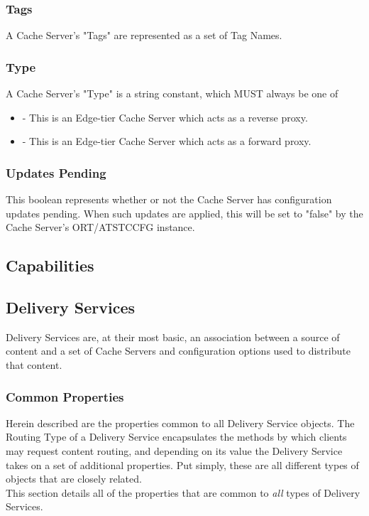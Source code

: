 \subsubsection{Tags}
A Cache Server's "Tags" are represented as a set of Tag Names.

\subsubsection{Type}
A Cache Server's "Type" is a string constant, which MUST always be one of

\begin{itemize}
	\item {} - This is an Edge-tier Cache Server which acts as a
	reverse proxy.
	\item {} - This is an Edge-tier Cache Server which acts as a forward
	proxy.
\end{itemize}

\subsubsection{Updates Pending}
This boolean represents whether or not the Cache Server has configuration
updates pending. When such updates are applied, this will be set to "false" by
the Cache Server's ORT/ATSTCCFG instance.


\subsection{Capabilities}


\subsection{Delivery Services}
Delivery Services are, at their most basic, an association between a source of
content and a set of Cache Servers and configuration options used to distribute
that content.

\subsubsection{Common Properties}
Herein described are the properties common to all Delivery Service objects. The
Routing Type of a Delivery Service encapsulates the methods by which clients
may request content routing, and depending on its value the Delivery Service
takes on a set of additional properties. Put simply, these are all different
types of objects that are closely related.\\
This section details all of the properties that are common to \emph{all} types
of Delivery Services.

